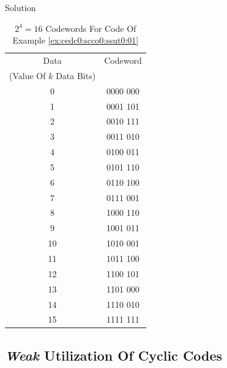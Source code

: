 \begin{vworkexampleparsection}{Solution}
\begin{table}
\caption{$2^4 = 16$ Codewords For Code Of Example \ref{ex:cedc0:scco0:ssut0:01}}
\label{tbl:ex:cedc0:scco0:ssut0:01:01}
\begin{center}
\begin{tabular}{|c|c|}
\hline
Data                      & Codeword  \\
(Value Of $k$ Data Bits)  &           \\
\hline
\hline
 0             &  0000 000 \\
\hline
 1             &  0001 101 \\
\hline
 2             &  0010 111 \\
\hline
 3             &  0011 010 \\
\hline
 4             &  0100 011 \\
\hline
 5             &  0101 110 \\
\hline
 6             &  0110 100 \\
\hline
 7             &  0111 001 \\
\hline
 8             &  1000 110 \\
\hline
 9             &  1001 011 \\
\hline
10             &  1010 001 \\
\hline
11             &  1011 100 \\
\hline
12             &  1100 101 \\
\hline
13             &  1101 000 \\
\hline
14             &  1110 010 \\
\hline
15             &  1111 111 \\
\hline
\end{tabular}
\end{center}
\end{table}
\end{vworkexampleparsection}
\vworkexamplefooter{}



\subsection{\emph{Weak} Utilization Of Cyclic Codes}
\label{cedc0:scco0:swut0}


